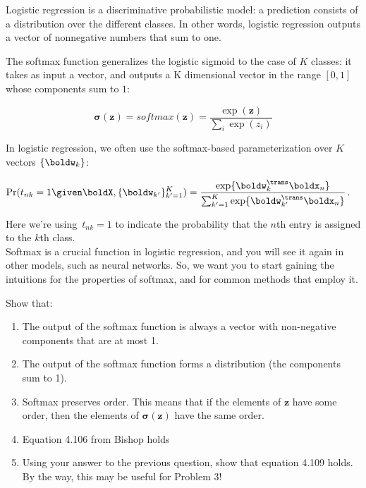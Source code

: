 \documentclass[submit]{harvardml}
\begin{document}
\begin{problem}

Logistic regression is a discriminative probabilistic model: a prediction
consists of a distribution over the different classes. In other words, logistic
regression outputs a vector of nonnegative numbers that sum to one.

The softmax function generalizes the logistic sigmoid to the case of $K$
classes: it takes as input a vector, and outputs a K dimensional vector in the
range $[0,1]$ whose components sum to $1$:

\[ \bm{\sigma}(\mathbf{z}) = softmax(\mathbf{z}) =
\frac{\exp(\mathbf{z})}{\sum_i\exp(z_i)}\]

In logistic regression, we often use the softmax-based parameterization over $K$ vectors $\{\boldw_k\}$:

\begin{align*}
  \Pr(t_{nk}=1 \given \boldX, \{\boldw_{k'}\}^K_{k'=1})
  &= \frac{ \exp\{ \boldw_k^{\trans}\boldx_n \} }
  { \sum_{k'=1}^K \exp\{ \boldw_{k'}^{\trans}\boldx_n \} }\,.
\end{align*}

Here we're using~${t_{nk}=1}$ to indicate the probability that the $n$th entry
is assigned to the $k$th class.\\

Softmax is a crucial function in logistic regression, and you will see it again in other models, such as neural networks. 
So, we want you to start gaining the intuitions for the properties of softmax, and for common methods that employ it. 

Show that:
\begin{enumerate}
  \item The output of the softmax function is always a vector with non-negative components
    that are at most 1. 
  \item The output of the softmax function forms a distribution (the components sum to 1).
  \item Softmax preserves order. This means that if the elements of $\mathbf{z}$ have some order, then the elements of $\bm{\sigma}(\mathbf{z})$ have the same order. 
  \item Equation 4.106 from Bishop holds
  \item Using your answer to the previous question, show that equation 4.109
    holds. By the way, this may be useful for Problem 3!
\end{enumerate}
\end{problem}
\end{document}
